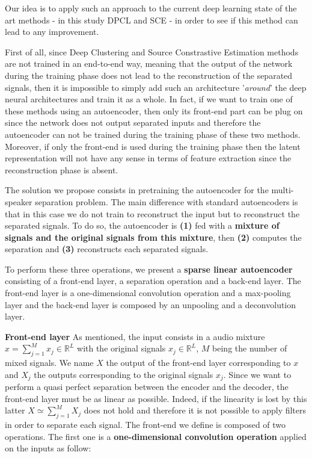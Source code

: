 \documentclass[master, tikz, final,11pt, dvipdfmx]{iscs-thesis}
\begin{document}
Our idea is to apply such an approach to the current deep learning state of the art methods - in this study DPCL and SCE - in order to see if this method can lead to any improvement.
 
First of all, since Deep Clustering and Source Constrastive Estimation methods are not trained in an end-to-end way, meaning that the output of the network during the training phase does not lead to the reconstruction of the separated signals, then it is impossible to simply add such an architecture '\textit{around}' the deep neural architectures and train it as a whole. In fact, if we want to train one of these methods using an autoencoder, then only its front-end part can be plug on since the network does not output separated inputs and therefore the autoencoder can not be trained during the training phase of these two methods. Moreover, if only the front-end is used during the training phase then the latent representation will not have any sense in terms of feature extraction since the reconstruction phase is absent. 

The solution we propose consists in pretraining the autoencoder for the multi-speaker separation problem. The main difference with standard autoencoders is that in this case we do not train to reconstruct the input but to reconstruct the separated signals. To do so, the autoencoder is \textbf{(1)} fed with a \textbf{mixture of signals and the original signals from this mixture}, then \textbf{(2)} computes the separation and \textbf{(3)} reconstructs each separated signals.

To perform these three operations, we present a \textbf{sparse linear autoencoder} consisting of a front-end layer, a separation operation and a back-end layer. The front-end layer is a one-dimensional convolution operation and a max-pooling layer and the back-end layer is composed by an unpooling and a deconvolution layer.

\textbf{Front-end layer}
As mentioned, the input consists in a audio mixture $x = \sum_{j=1}^{M}{x_j} \in \mathbb{R}^L$ with the original signals $x_j \in \mathbb{R}^L$, $M$ being the number of mixed signals. We name $X$ the output of the front-end layer corresponding to $x$ and $X_j$ the outputs corresponding to the original signals $x_j$. Since we want to perform a quasi perfect separation between the encoder and the decoder, the front-end layer must be as linear as possible. Indeed, if the linearity is lost by this latter $X \simeq \sum_{j=1}^{M}{X_j}$ does not hold and therefore it is not possible to apply filters in order to separate each signal.
The front-end we define is composed of two operations. The first one is a \textbf{one-dimensional convolution operation} applied on the inputs as follow:
\end{document}

